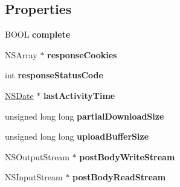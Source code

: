 \subsection*{\-Properties}
\begin{DoxyCompactItemize}
\item 
\hypertarget{interface_a_s_i_h_t_t_p_request_07_08_a680596f26bbb315040432548026fa667}{
\-B\-O\-O\-L {\bfseries complete}}
\label{interface_a_s_i_h_t_t_p_request_07_08_a680596f26bbb315040432548026fa667}

\item 
\hypertarget{interface_a_s_i_h_t_t_p_request_07_08_a1bca9e39548686b85c95be6d732a71af}{
\-N\-S\-Array $\ast$ {\bfseries response\-Cookies}}
\label{interface_a_s_i_h_t_t_p_request_07_08_a1bca9e39548686b85c95be6d732a71af}

\item 
\hypertarget{interface_a_s_i_h_t_t_p_request_07_08_ab65718e45d48417c1231bb2a13fd0929}{
int {\bfseries response\-Status\-Code}}
\label{interface_a_s_i_h_t_t_p_request_07_08_ab65718e45d48417c1231bb2a13fd0929}

\item 
\hypertarget{interface_a_s_i_h_t_t_p_request_07_08_ade8f0d6f817092547fbff84379daf78b}{
\hyperlink{class_n_s_date}{\-N\-S\-Date} $\ast$ {\bfseries last\-Activity\-Time}}
\label{interface_a_s_i_h_t_t_p_request_07_08_ade8f0d6f817092547fbff84379daf78b}

\item 
\hypertarget{interface_a_s_i_h_t_t_p_request_07_08_a5f36294fb4499229e0dbf4c113f59582}{
unsigned long long {\bfseries partial\-Download\-Size}}
\label{interface_a_s_i_h_t_t_p_request_07_08_a5f36294fb4499229e0dbf4c113f59582}

\item 
\hypertarget{interface_a_s_i_h_t_t_p_request_07_08_a94e04e60034c03bc871788734c6ea7aa}{
unsigned long long {\bfseries upload\-Buffer\-Size}}
\label{interface_a_s_i_h_t_t_p_request_07_08_a94e04e60034c03bc871788734c6ea7aa}

\item 
\hypertarget{interface_a_s_i_h_t_t_p_request_07_08_ab10c23b50402c45c4c23103a78c60258}{
\-N\-S\-Output\-Stream $\ast$ {\bfseries post\-Body\-Write\-Stream}}
\label{interface_a_s_i_h_t_t_p_request_07_08_ab10c23b50402c45c4c23103a78c60258}

\item 
\hypertarget{interface_a_s_i_h_t_t_p_request_07_08_ab864fc483e0d7b7e524f0463b23ee8e0}{
\-N\-S\-Input\-Stream $\ast$ {\bfseries post\-Body\-Read\-Stream}}
\label{interface_a_s_i_h_t_t_p_request_07_08_ab864fc483e0d7b7e524f0463b23ee8e0}


\end{DoxyCompactItemize}

